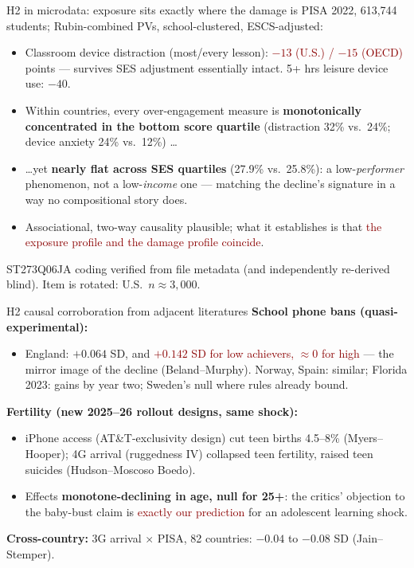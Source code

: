 \documentclass[11pt,aspectratio=169]{beamer}
\newcommand{\red}[1]{\textcolor{darkred}{#1}}
\newcommand{\gray}[1]{\textcolor{ltgray}{#1}}
\newcommand{\src}[1]{\vfill\gray{\scriptsize #1}}
\begin{document}
\begin{frame}{H2 in microdata: exposure sits exactly where the damage is}
PISA 2022, 613{,}744 students; Rubin-combined PVs, school-clustered, ESCS-adjusted:
\begin{itemize}
\item Classroom device distraction (most/every lesson): \red{$-13$ (U.S.) / $-15$ (OECD)} points --- survives SES adjustment essentially intact. 5+ hrs leisure device use: $-40$.
\item Within countries, every over-engagement measure is \textbf{monotonically concentrated in the bottom score quartile} (distraction 32\% vs.\ 24\%; device anxiety 24\% vs.\ 12\%) \ldots
\item \ldots yet \textbf{nearly flat across SES quartiles} (27.9\% vs.\ 25.8\%): a low-\emph{performer} phenomenon, not a low-\emph{income} one --- matching the decline's signature in a way no compositional story does.
\item Associational, two-way causality plausible; what it establishes is that \red{the exposure profile and the damage profile coincide}.
\end{itemize}
\src{ST273Q06JA coding verified from file metadata (and independently re-derived blind). Item is rotated: U.S.\ $n\approx3{,}000$.}
\end{frame}

\begin{frame}{H2 causal corroboration from adjacent literatures}
\textbf{School phone bans (quasi-experimental):}
\begin{itemize}
\item England: $+0.064$ SD, and \red{$+0.142$ SD for low achievers, $\approx$0 for high} --- the mirror image of the decline (Beland--Murphy). Norway, Spain: similar; Florida 2023: gains by year two; Sweden's null where rules already bound.
\end{itemize}
\textbf{Fertility (new 2025--26 rollout designs, same shock):}
\begin{itemize}
\item iPhone access (AT\&T-exclusivity design) cut teen births 4.5--8\% (Myers--Hooper); 4G arrival (ruggedness IV) collapsed teen fertility, raised teen suicides (Hudson--Moscoso Boedo).
\item Effects \textbf{monotone-declining in age, null for 25+}: the critics' objection to the baby-bust claim is \red{exactly our prediction} for an adolescent learning shock.
\end{itemize}
\textbf{Cross-country:} 3G arrival $\times$ PISA, 82 countries: $-0.04$ to $-0.08$ SD (Jain--Stemper).
\end{frame}
\end{document}
